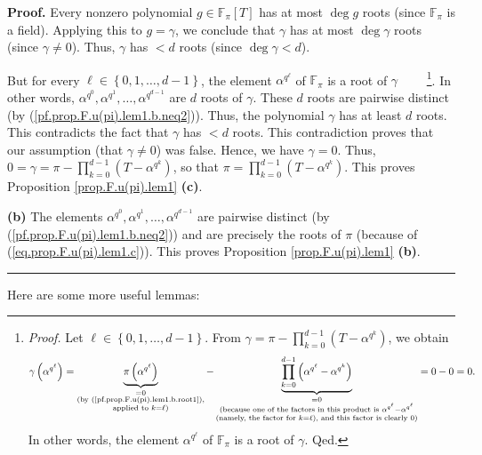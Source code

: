 \documentclass[numbers=enddot,12pt,final,onecolumn,notitlepage]{scrartcl}%
\theoremstyle{definition}
\newenvironment{proof}[1][Proof]{\noindent\textbf{#1.} }{\ \rule{0.5em}{0.5em}}
\let\prodnonlimits\prod
\renewcommand{\prod}{\prodnonlimits\limits}
\begin{document}
\begin{proof}
Every nonzero polynomial $g\in\mathbb{F}_{\pi}\left[  T\right]  $ has at most
$\deg g$ roots (since $\mathbb{F}_{\pi}$ is a field). Applying this to
$g=\gamma$, we conclude that $\gamma$ has at most $\deg\gamma$ roots (since
$\gamma\neq0$). Thus, $\gamma$ has $<d$ roots (since $\deg\gamma<d$).

But for every $\ell\in\left\{  0,1,\ldots,d-1\right\}  $, the element
$\alpha^{q^{\ell}}$ of $\mathbb{F}_{\pi}$ is a root of $\gamma$%
\ \ \ \ \footnote{\textit{Proof.} Let $\ell\in\left\{  0,1,\ldots,d-1\right\}
$. From $\gamma=\pi-\prod_{k=0}^{d-1}\left(  T-\alpha^{q^{k}}\right)  $, we
obtain%
\[
\gamma\left(  \alpha^{q^{\ell}}\right)  =\underbrace{\pi\left(  \alpha
^{q^{\ell}}\right)  }_{\substack{=0\\\text{(by
(\ref{pf.prop.F.u(pi).lem1.b.root1}),}\\\text{applied to }k=\ell\text{)}%
}}-\underbrace{\prod_{k=0}^{d-1}\left(  \alpha^{q^{\ell}}-\alpha^{q^{k}%
}\right)  }_{\substack{=0\\\text{(because one of the factors in this product
is }\alpha^{q^{\ell}}-\alpha^{q^{\ell}}\\\text{(namely, the factor for }%
k=\ell\text{), and this factor is clearly }0\text{)}}}=0-0=0.
\]
In other words, the element $\alpha^{q^{\ell}}$ of $\mathbb{F}_{\pi}$ is a
root of $\gamma$. Qed.}. In other words, $\alpha^{q^{0}},\alpha^{q^{1}}%
,\ldots,\alpha^{q^{d-1}}$ are $d$ roots of $\gamma$. These $d$ roots are
pairwise distinct (by (\ref{pf.prop.F.u(pi).lem1.b.neq2})). Thus, the
polynomial $\gamma$ has at least $d$ roots. This contradicts the fact that
$\gamma$ has $<d$ roots. This contradiction proves that our assumption (that
$\gamma\neq0$) was false. Hence, we have $\gamma=0$. Thus, $0=\gamma=\pi
-\prod_{k=0}^{d-1}\left(  T-\alpha^{q^{k}}\right)  $, so that $\pi=\prod
_{k=0}^{d-1}\left(  T-\alpha^{q^{k}}\right)  $. This proves Proposition
\ref{prop.F.u(pi).lem1} \textbf{(c)}. \medskip

\textbf{(b)} The elements $\alpha^{q^{0}},\alpha^{q^{1}},\ldots,\alpha
^{q^{d-1}}$ are pairwise distinct (by (\ref{pf.prop.F.u(pi).lem1.b.neq2})) and
are precisely the roots of $\pi$ (because of (\ref{eq.prop.F.u(pi).lem1.c})).
This proves Proposition \ref{prop.F.u(pi).lem1} \textbf{(b)}.
\end{proof}

Here are some more useful lemmas:
\end{document}
